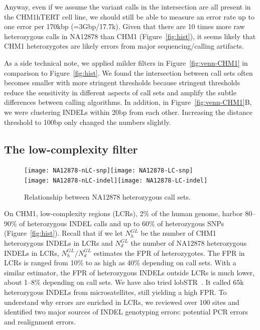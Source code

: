 \documentclass{bioinfo-ori}
\begin{document}
Anyway, even if we assume the variant calls in the intersection are all present
in the CHM1hTERT cell line, we should still be able to measure an error rate up
to one error per 170kbp (=3Gbp/17.7k). Given that there are 10 times more raw
heterozygous calls in NA12878 than CHM1 (Figure~\ref{fig:hist}), it seems likely that CHM1
heterozygotes are likely errors from major sequencing/calling artifacts.


As a side technical note, we applied milder filters in
Figure~\ref{fig:venn-CHM1} in comparison to Figure~\ref{fig:hist}. We found the
intersection between call sets often becomes smaller with more stringent
thresholds because stringent thresholds reduce the sensitivity in different
aspects of call sets and amplify the subtle differences between calling algorithms. In
addition, in Figure~\ref{fig:venn-CHM1}B, we were clustering INDELs
within 20bp from each other. Increasing the distance threshold to 100bp only
changed the numbers slightly.

\subsection{The low-complexity filter}\label{sec:lc}

\begin{figure}[!htb]
\texttt{[image: NA12878-nLC-snp]}\texttt{[image: NA12878-LC-snp]}\\
\texttt{[image: NA12878-nLC-indel]}\texttt{[image: NA12878-LC-indel]}
\caption{Relationship between NA12878 heterozygous call sets.}\label{fig:venn-NA12878}
\end{figure}

On CHM1, low-complexity regions (LCRs), 2\% of the human genome, harbor
80--90\% of heterozygous INDEL calls and up to 60\% of heterozygous SNPs
(Figure~\ref{fig:hist}). Recall that if we let $N_h^{GL}$ be the number of CHM1
heterozygous INDELs in LCRs and $N_d^{GL}$ the number of NA12878 heterozygous
INDELs in LCRs, $N_h^{GL}/N_d^{GL}$ estimates the FPR of heterozygotes. The FPR
in LCRs is ranged from 10\% to as high as 40\% depending on call sets. With a
similar estimator, the FPR of heterozygous INDELs outside LCRs is much lower, about 1--8\% depending on call sets.
We have also tried lobSTR~\citep{Gymrek:2012aa}. It called 65k
heterozygous INDELs from microsatellites, still yielding a high FPR. To
understand why errors are enriched in LCRs, we reviewed over 100 sites and
identified two major sources of INDEL genotyping errors: potential PCR errors
and realignment errors.
\end{document}
